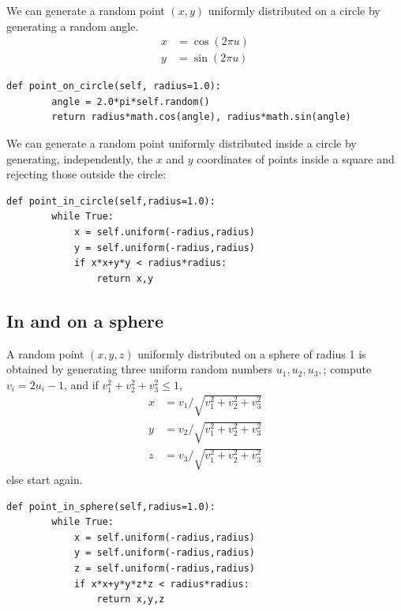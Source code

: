 \documentclass[justified,sixbynine]{tufte-book}
\def\ft{\small\tt}
\theoremstyle{plain}%
\theoremstyle{definition}
\theoremstyle{remark}
\begin{document}
\begin{fullwidth}
We can generate a random point $(x,y)$ uniformly distributed on a circle by generating a random angle.
\begin{align}
x &= \cos (2\pi u) \\
y &= \sin (2\pi u)
\end{align}

\begin{lstlisting}[caption={in file: {\ft nlib.py}}]
    def point_on_circle(self, radius=1.0):
        angle = 2.0*pi*self.random()
        return radius*math.cos(angle), radius*math.sin(angle)
\end{lstlisting}

We can generate a random point uniformly distributed inside a circle by generating, independently, the $x$ and $y$ coordinates of points inside a square and rejecting those outside the circle:

\begin{lstlisting}[caption={in file: {\ft nlib.py}}]
    def point_in_circle(self,radius=1.0):
        while True:
            x = self.uniform(-radius,radius)
            y = self.uniform(-radius,radius)
            if x*x+y*y < radius*radius:
                return x,y
\end{lstlisting}

\goodbreak\subsection{In and on a sphere}

A random point $(x,y,z)$ uniformly distributed on a sphere of radius 1 is
obtained by generating three uniform random numbers $u_1,u_2,u_3,$; compute $%
v_i=2u_i-1$, and if $v_1^2+v_2^2+v_3^2\leq 1$,
\begin{align}
x &= v_1/\sqrt{v_1^2+v_2^2+v_3^2} \\
y &= v_2/\sqrt{v_1^2+v_2^2+v_3^2} \\
z &= v_3/\sqrt{v_1^2+v_2^2+v_3^2}
\end{align}
else start again.

\begin{lstlisting}[caption={in file: {\ft nlib.py}}]
    def point_in_sphere(self,radius=1.0):
        while True:
            x = self.uniform(-radius,radius)
            y = self.uniform(-radius,radius)
            z = self.uniform(-radius,radius)
            if x*x+y*y*z*z < radius*radius:
                return x,y,z


\end{lstlisting}
\end{fullwidth}
\end{document}
